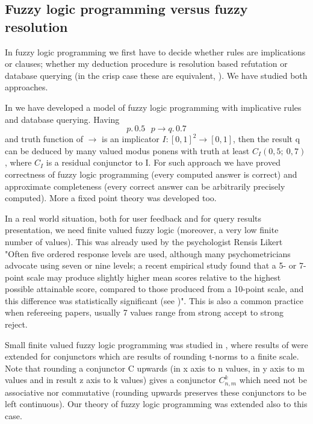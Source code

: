 \subsection{Fuzzy logic programming versus fuzzy resolution}
     In fuzzy logic programming we first have to decide whether rules are implications or clauses; whether my deduction procedure is resolution based refutation or database querying (in the crisp case these are equivalent, \cite{10}). We have studied both approaches. 
     
     In \cite{3} we have developed a model of fuzzy logic programming with implicative rules and database querying. Having 
\begin{displaymath}
p.\,0.5\ \ \ p\rightarrow q.\,0.7	
\end{displaymath}
and truth function of $\rightarrow$ is an implicator $I:[0,1]^2 \rightarrow [0,1]$, then the result q can be deduced by many valued modus ponens with truth at least $C_I(0,5;\ 0,7)$, where $C_I$ is a residual conjunctor to I. For such approach we have proved correctness of fuzzy logic programming (every computed answer is correct) and approximate completeness (every correct answer can be arbitrarily precisely computed). More a fixed point theory was developed too. 
     
     In a real world situation, both for user feedback and for query results presentation, we need finite valued fuzzy logic (moreover, a very low finite number of values). This was already used by the psychologist Rensis Likert "Often five ordered response levels are used, although many psychometricians advocate using seven or nine levels; a recent empirical study found that a 5- or 7- point scale may produce slightly higher mean scores relative to the highest possible attainable score, compared to those produced from a 10-point scale, and this difference was statistically significant (see \cite{Li})". This is also a common practice when refereeing papers, usually 7 values range from strong accept to strong reject. 
     
          Small finite valued fuzzy logic programming was studied in \cite{16}, where results of \cite{3} were extended for conjunctors which are results of rounding t-norms to a finite scale. Note that rounding a conjunctor C upwards (in x axis to n values, in y axis to m values and in result z axis to k values) gives a conjunctor $C_{n,m}^{k}$ which need not be associative nor commutative (rounding upwards preserves these conjunctors to be left continuous). Our theory of fuzzy logic programming was extended also to this case. 
     

